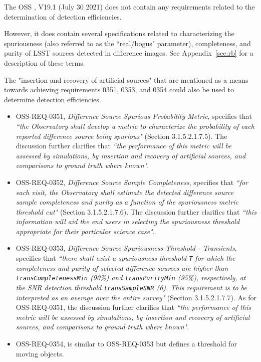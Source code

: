 The OSS , V19.1 (July 30 2021) does not contain any requirements related to the determination of detection efficiencies.

However, it does contain several specifications related to characterizing the spuriousness (also referred to as the ``real/bogus" parameter), completeness, and purity of LSST sources detected in difference images.
See Appendix~\ref{sec:rb} for a description of these terms.

The "insertion and recovery of artificial sources" that are mentioned as a means towards achieving requirements 0351, 0353, and 0354 could also be used to determine detection efficiencies.

\begin{itemize}

\item OSS-REQ-0351, {\it Difference Source Spurious Probability Metric}, specifies that {\it ``the Observatory shall develop a metric to characterize the probability of each reported difference source being spurious"} (Section 3.1.5.2.1.7.5).
The discussion further clarifies that {\it ``the performance of this metric will be assessed by simulations, by insertion and recovery of artificial sources, and comparisons to ground truth where known"}.

\item OSS-REQ-0352, {\it Difference Source Sample Completeness}, specifies that {\it ``for each visit, the Observatory shall estimate the detected difference source sample completeness and purity as a function of the spuriousness metric threshold cut"} (Section 3.1.5.2.1.7.6).
The discussion further clarifies that {\it ``this information will aid the end
users in selecting the spuriousness threshold appropriate for their particular science case"}.

\item OSS-REQ-0353, {\it Difference Source Spuriousness Threshold - Transients}, specifies that {\it ``there shall exist a spuriousness threshold {\tt T} for which the completeness and purity of selected difference sources are higher than {\tt transCompletenessMin} (90\%) and {\tt transPurityMin} (95\%), respectively, at the SNR detection threshold {\tt transSampleSNR} (6). This requirement is to be interpreted as an average over the entire survey"} (Section 3.1.5.2.1.7.7).
As for OSS-REQ-0351, the discussion further clarifies that {\it ``the performance of this metric will be assessed by simulations, by insertion and recovery of artificial sources, and comparisons to ground truth where known"}.

\item OSS-REQ-0354, is similar to OSS-REQ-0353 but defines a threshold for moving objects.

\end{itemize}

